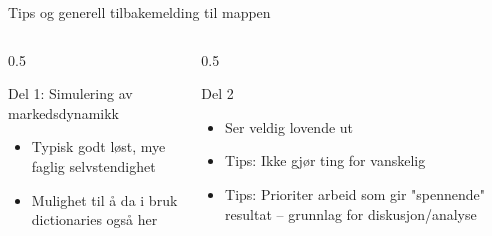 \documentclass[aspectratio=169]{beamer}
\begin{document}
\begin{frame}{Tips og generell tilbakemelding til mappen}
   \footnotesize
   \begin{columns}
      \begin{column}{0.5\textwidth}
         \begin{block}{Del 1: Simulering av markedsdynamikk}
            \begin{itemize}
               \item {Typisk godt løst, mye faglig selvstendighet}
               \item {Mulighet til å da i bruk dictionaries også her}
            \end{itemize}
         \end{block}
      \end{column}
      \begin{column}{0.5\textwidth}
         \begin{block}{Del 2}
            \begin{itemize}
               \item {Ser veldig lovende ut}
               \item {Tips: Ikke gjør ting for vanskelig }
               \item {Tips: Prioriter arbeid som gir "spennende" resultat -- grunnlag for diskusjon/analyse}
            \end{itemize}
         \end{block}
      \end{column}
   \end{columns}
\end{frame}
\end{document}
